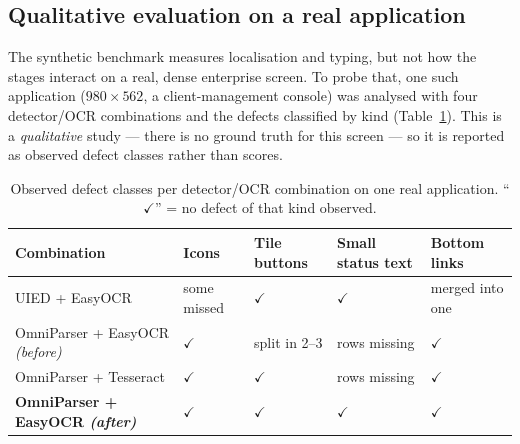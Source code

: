 \documentclass[11pt,a4paper]{article}
\begin{document}
\subsection{Qualitative evaluation on a real application}
\label{sec:realapp}
The synthetic benchmark measures localisation and typing, but not how the stages
interact on a real, dense enterprise screen. To probe that, one such application
($980\times562$, a client-management console) was analysed with four
detector/OCR combinations and the defects classified by kind
(Table~\ref{tab:combos}). This is a \emph{qualitative} study --- there is no ground
truth for this screen --- so it is reported as observed defect classes rather than
scores.

\begin{table}[H]
  \centering\footnotesize
  \caption{Observed defect classes per detector/OCR combination on one real
  application. ``$\checkmark$'' = no defect of that kind observed.}
  \label{tab:combos}
  \begin{tabular}{@{}p{4.5cm}p{2.2cm}p{2.2cm}p{2.4cm}p{2.2cm}@{}}
    \toprule
    Combination & Icons & Tile buttons & Small status text & Bottom links \\
    \midrule
    UIED + EasyOCR & some missed & $\checkmark$ & $\checkmark$ & merged into one \\
    OmniParser + EasyOCR \emph{(before)} & $\checkmark$ & split in 2--3 & rows missing & $\checkmark$ \\
    OmniParser + Tesseract & $\checkmark$ & $\checkmark$ & rows missing & $\checkmark$ \\
    \textbf{OmniParser + EasyOCR \emph{(after)}} & $\checkmark$ & $\checkmark$ & $\checkmark$ & $\checkmark$ \\
    \bottomrule
  \end{tabular}
\end{table}
\end{document}
